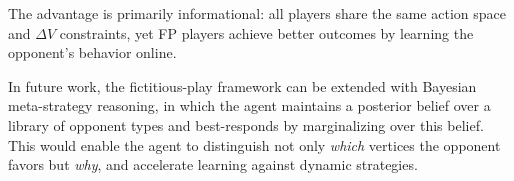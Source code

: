 

The advantage is primarily informational: all players share the same action space and $\Delta V$ constraints, yet FP players achieve better outcomes by learning the opponent's behavior online.

In future work, the fictitious-play framework can be extended with Bayesian meta-strategy reasoning, in which the agent maintains a posterior belief over a library of opponent types and best-responds by marginalizing over this belief. This would enable the agent to distinguish not only \textit{which} vertices the opponent favors but \textit{why}, and accelerate learning against dynamic strategies.